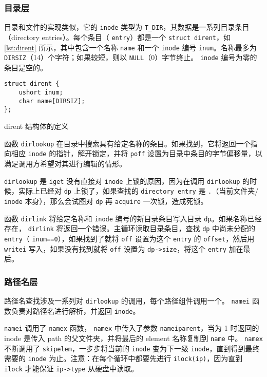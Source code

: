 \subsubsection{目录层}

目录和文件的实现类似，它的 \texttt{inode} 类型为 \texttt{T\_DIR}，其数据是一系列目录条目（directory entries）。每个条目（ \texttt{entry}）都是一个 \texttt{struct dirent}，如 \cref{lst:dirent} 所示，其中包含一个名称 \texttt{name} 和一个 \texttt{inode} 编号 \texttt{inum}。名称最多为 \texttt{DIRSIZ}（14）个字符；如果较短，则以 \texttt{NULL}（0）字节终止。 \texttt{inode} 编号为零的条目是空的。

\begin{listing}[!htb]
	\begin{verbatim}
struct dirent {
    ushort inum;
    char name[DIRSIZ];
};
	\end{verbatim}
	\caption{dirent 结构体的定义}\label{lst:dirent}
\end{listing}

函数 \texttt{dirlookup} 在目录中搜索具有给定名称的条目。如果找到，它将返回一个指向相应 \texttt{inode} 的指针，解开锁定，并将 \texttt{poff} 设置为目录中条目的字节偏移量，以满足调用方希望对其进行编辑的情形。

\texttt{dirlookup} 是 \texttt{iget} 没有直接对 \texttt{inode} 上锁的原因，因为在调用 \texttt{dirlookup} 的时候，实际上已经对 \texttt{dp} 上锁了，如果查找的 \texttt{directory entry} 是 \texttt{.}（当前文件夹/ \texttt{inode} 本身），那么会试图对 \texttt{dp} 再 \texttt{acquire} 一次锁，造成死锁。

函数 \texttt{dirlink} 将给定名称和 \texttt{inode} 编号的新目录条目写入目录 \texttt{dp}。如果名称已经存在， \texttt{dirlink} 将返回一个错误。主循环读取目录条目，查找 \texttt{dp} 中尚未分配的 \texttt{entry}（ \texttt{inum==0}），如果找到了就将 \texttt{off} 设置为这个 \texttt{entry} 的 \texttt{offset}，然后用 \texttt{writei} 写入，如果没有找到就将 \texttt{off} 设置为 \texttt{dp->size}，将这个 \texttt{entry} 加在最后。

\subsubsection{路径名层}

路径名查找涉及一系列对 \texttt{dirlookup} 的调用，每个路径组件调用一个。
\texttt{namei} 函数负责对路径名进行解析，并返回 \texttt{inode}。 

\texttt{namei} 调用了 \texttt{namex} 函数， \texttt{namex} 中传入了参数 \texttt{nameiparent}，当为 1 时返回的 inode 是传入 path 的父文件夹，并将最后的 element 名称复制到 \texttt{name} 中。 \texttt{namex} 不断调用了 \texttt{skipelem}，一步步将当前的 \texttt{inode} 变为下一级 \texttt{inode}，直到得到最终需要的 \texttt{inode} 为止。注意：在每个循环中都要先进行 \texttt{ilock(ip)}，因为直到 \texttt{ilock} 才能保证 \texttt{ip->type} 从硬盘中读取。

